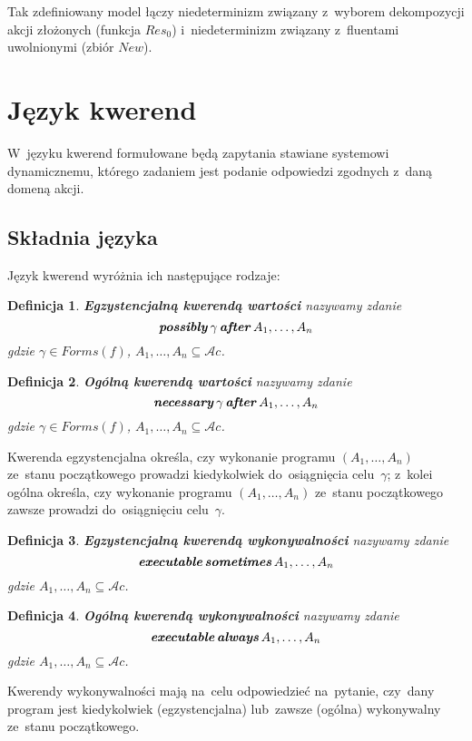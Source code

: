 \documentclass[11pt,a4paper]{article}
\newtheorem{defn}{Definicja}
\DeclareMathOperator{\After}{\textbf{\textit{after}}}
\DeclareMathOperator{\Always}{\textbf{\textit{always}}}
\DeclareMathOperator{\Sometimes}{\textbf{\textit{sometimes}}}
\DeclareMathOperator{\Executable}{\textbf{\textit{executable}}}
\DeclareMathOperator{\Possibly}{\textbf{\textit{possibly}}}
\DeclareMathOperator{\Necessary}{\textbf{\textit{necessary}}}
\begin{document}
Tak zdefiniowany model łączy niedeterminizm związany z~wyborem dekompozycji akcji złożonych (funkcja $Res_0$) i~niedeterminizm związany z~fluentami uwolnionymi (zbiór $New$).

\section{Język kwerend}

W~języku kwerend formułowane będą zapytania stawiane systemowi dynamicznemu, którego zadaniem jest podanie odpowiedzi zgodnych z~daną domeną akcji.

\subsection{Składnia języka}
    Język kwerend wyróżnia ich następujące rodzaje:

    \begin{defn}
        \textbf{Egzystencjalną kwerendą wartości} nazywamy zdanie
        $$ \Possibly \gamma \After A_1, \dots, A_n $$
        gdzie $\gamma \in Forms(f)$, $A_1, \dots, A_n \subseteq \mathcal{A}c$.
    \end{defn}

    \begin{defn}
        \textbf{Ogólną kwerendą wartości} nazywamy zdanie
        $$ \Necessary \gamma \After A_1, \dots, A_n $$
        gdzie $\gamma \in Forms(f)$, $A_1, \dots, A_n \subseteq \mathcal{A}c$.
    \end{defn}

    Kwerenda egzystencjalna określa, czy wykonanie programu $(A_1, \dots, A_n)$ ze~stanu początkowego prowadzi kiedykolwiek do~osiągnięcia celu~$\gamma$; z~kolei ogólna określa, czy wykonanie programu $(A_1, \dots, A_n)$ ze~stanu początkowego zawsze prowadzi do~osiągnięciu celu~$\gamma$.

    \begin{defn}
        \textbf{Egzystencjalną kwerendą wykonywalności} nazywamy zdanie
        $$ \Executable \Sometimes A_1, \dots, A_n $$
        gdzie $A_1, \dots, A_n \subseteq \mathcal{A}c$.
    \end{defn}

    \begin{defn}
        \textbf{Ogólną kwerendą wykonywalności} nazywamy zdanie
        $$ \Executable \Always A_1, \dots, A_n $$
        gdzie $A_1, \dots, A_n \subseteq \mathcal{A}c$.
    \end{defn}

    Kwerendy wykonywalności mają na~celu odpowiedzieć na~pytanie, czy~dany program jest kiedykolwiek (egzystencjalna) lub~zawsze (ogólna) wykonywalny ze~stanu początkowego.
\end{document}

